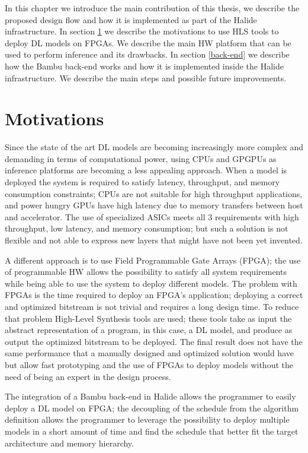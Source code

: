 \documentclass[../main.tex]{subfiles}
\begin{document}
In this chapter we introduce the main contribution of this thesis, we describe the proposed design flow and how it is implemented as part of the Halide infrastructure. 
In section \ref{motivations} we describe the motivations to use HLS tools to deploy DL models on FPGAs. We describe the main HW platform that can be used to perform inference and its drawbacks. 
In section \ref{back-end} we describe how the Bambu back-end works and how it is implemented inside the Halide infrastructure. We describe the main steps and possible future improvements.

\newpage

\section{Motivations}
\label {motivations}
Since the state of the art DL models are becoming increasingly more complex and demanding in terms of computational power, using CPUs and GPGPUs as inference platforms are becoming a less appealing approach. 
When a model is deployed the system is required to satisfy latency, throughput, and memory consumption constraints; CPUs are not suitable for high throughput applications, and power hungry GPUs have high latency due to memory transfers between host and accelerator.
The use of specialized ASICs meets all 3 requirements with high throughput, low latency, and memory consumption; but such a solution is not flexible and not able to express new layers that might have not been yet invented.

A different approach is to use Field Programmable Gate Arrays (FPGA); the use of programmable HW allows the possibility to satisfy all system requirements while being able to use the system to deploy different models.
The problem with FPGAs is the time required to deploy an FPGA's application; deploying a correct and optimized bitstream is not trivial and requires a long design time. To reduce that problem High-Level Synthesis tools are used; these tools take as input the abstract representation of a program, in this case, a DL model, and produce as output the optimized bitstream to be deployed. The final result does not have the same performance that a manually designed and optimized solution would have but allow fast prototyping and the use of FPGAs to deploy models without the need of being an expert in the design process.

The integration of a Bambu back-end in Halide allows the programmer to easily deploy a DL model on FPGA; the decoupling of the schedule from the algorithm definition allows the programmer to leverage the possibility to deploy multiple models in a short amount of time and find the schedule that better fit the target architecture and memory hierarchy.
\end{document}
